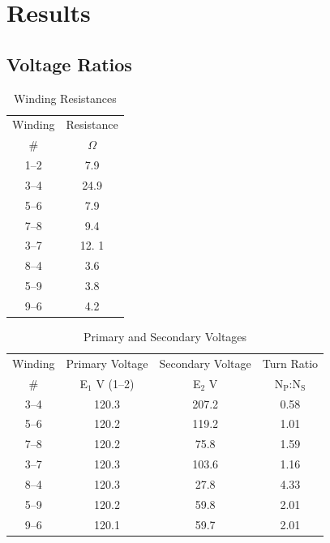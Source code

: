 \documentclass{article}
\begin{document}
\section{Results}
\subsection{Voltage Ratios}
\begin{table}[H]
  \centering
  \begin{tabular}{cc}
    \hline
    Winding & Resistance \\
    \# & $\Omega$ \\
    \hline
    1--2 &  7.9 \\
    3--4 & 24.9 \\
    5--6 &  7.9 \\
    7--8 &  9.4 \\
    3--7 & 12. 1\\
    8--4 &  3.6 \\
    5--9 &  3.8 \\
    9--6 &  4.2 \\
  \end{tabular}
  \caption{Winding Resistances}
  \label{tab:wind_res}
\end{table}

\begin{table}[H]
  \centering
  \begin{tabular}{cccc}
    \hline
    Winding & Primary Voltage & Secondary Voltage & Turn Ratio \\
    \# & E$_1$ V (1--2) & E$_2$ V & N$_\text{P}$:N$_\text{S}$\\
    \hline
    3--4 & 120.3 & 207.2 & 0.58 \\
    5--6 & 120.2 & 119.2 & 1.01 \\
    7--8 & 120.2 &  75.8 & 1.59 \\
    3--7 & 120.3 & 103.6 & 1.16 \\
    8--4 & 120.3 &  27.8 & 4.33 \\
    5--9 & 120.2 &  59.8 & 2.01 \\
    9--6 & 120.1 &  59.7 & 2.01 \\
  \end{tabular}
  \caption{Primary and Secondary Voltages}
  \label{tab:volt_rat}
\end{table}
\end{document}
